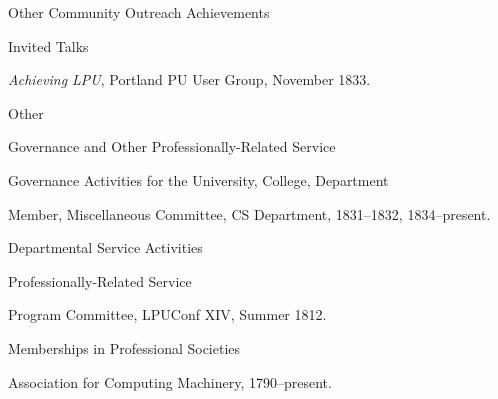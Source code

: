 \documentclass{psu-vita}
\begin{document}
%
\begin{majorhead}{Other Community Outreach Achievements}
  \begin{minorhead}{Invited Talks}
  \item {\em Achieving LPU},
    Portland PU User Group, November 1833.
  \end{minorhead}
  \begin{minorhead}{Other}
  \end{minorhead}    
\end{majorhead}
%
%
%
%
\begin{majorhead}{Governance and Other Professionally-Related Service}
  \begin{minorhead}{Governance Activities for the University,
                     College, Department}
    \item Member, Miscellaneous Committee, CS Department,
      1831--1832, 1834--present.
  \end{minorhead}
  \begin{minorhead}{Departmental Service Activities}
  \end{minorhead}
%
  \begin{minorhead}{Professionally-Related Service}
    \item Program Committee, LPUConf XIV, Summer 1812.
  \end{minorhead}
\end{majorhead}
%
\begin{majorhead}{Memberships in Professional Societies}
  \item Association for Computing Machinery, 1790--present.
\end{majorhead}
%


\end{document}
